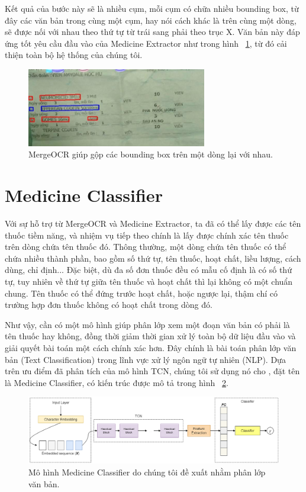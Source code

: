 Kết quả của bước này sẽ là nhiều cụm, mỗi cụm có chữa nhiều bounding box, từ đây các văn bản trong cùng một cụm, hay nói cách khác là trên cùng một dòng, sẽ được nối với nhau theo thứ tự từ trái sang phải theo trục X. Văn bản này đáp ứng tốt yêu cầu đầu vào của Medicine Extractor như trong hình ~\ref{merged_img}, từ đó cải thiện toàn bộ hệ thống  của chúng tôi.

\begin{figure}
\centering
\includegraphics[width=0.7\textwidth]{mep_img/merged_img.png}
\caption{MergeOCR giúp gộp các bounding box trên một dòng lại với nhau.}\label{merged_img}
\end{figure}

\section{Medicine Classifier}

Với sự hỗ trợ từ MergeOCR và Medicine Extractor, ta đã có thể lấy được các tên thuốc tiềm năng, và nhiệm vụ tiếp theo chính là lấy được chính xác tên thuốc trên dòng chứa tên thuốc đó. Thông thường, một dòng chứa tên thuốc có thể chứa nhiều thành phần, bao gồm số thứ tự, tên thuốc, hoạt chất, liều lượng, cách dùng, chỉ định... Đặc biệt, dù đa số đơn thuốc đều có mẫu cố định là có số thứ tự, tuy nhiên về thứ tự giữa tên thuốc và hoạt chất thì lại không có một chuẩn chung. Tên thuốc có thể đứng trước hoạt chất, hoặc ngược lại, thậm chí có trường hợp đơn thuốc không có hoạt chất trong dòng đó. 

Như vậy, cần có một mô hình giúp phân lớp xem một đoạn văn bản có phải là tên thuốc hay không, đồng thời giảm thời gian xử lý toàn bộ dữ liệu đầu vào và giải quyết bài toán một cách chính xác hơn. Đây chính là bài toán phân lớp văn bản (Text Classification) trong lĩnh vực xử lý ngôn ngữ tự nhiên (NLP). Dựa trên ưu điểm đã phân tích của mô hình TCN, chúng tôi sử dụng nó cho , đặt tên là Medicine Classifier, có kiến trúc được mô tả trong hình ~\ref{medicine_classifier_1}.

\begin{figure}
\centering
\includegraphics[width=1.0\textwidth]{mep_img/medicine_classifier_1.png}
\caption{Mô hình Medicine Classifier do chúng tôi đề xuất nhằm phân lớp văn bản.}\label{medicine_classifier_1}
\end{figure}


